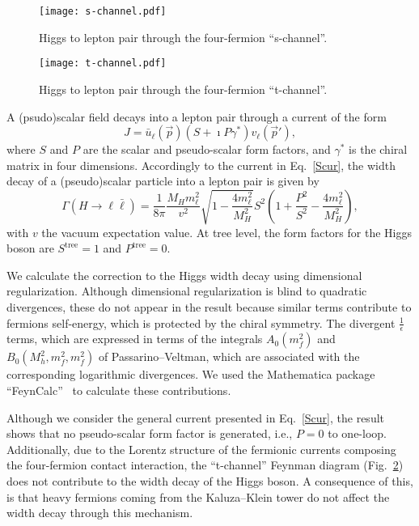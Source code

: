 \documentclass{ws-mpla}
\newcommand{\ga}{\gamma}
\renewcommand{\(}{\left(}
\renewcommand{\)}{\right)}
\renewcommand{\[}{\left[}
\renewcommand{\]}{\right]}
\begin{document}
\begin{figure}[htb]
  \begin{center}
    \texttt{[image: s-channel.pdf]}
  \end{center}
  \caption{Higgs to lepton pair through the four-fermion \mbox{``s-channel''.}}
  \label{fig:s}
\end{figure}
\begin{figure}[htb]
  \begin{center}
    \texttt{[image: t-channel.pdf]}
  \end{center}
  \caption{Higgs to lepton pair through the four-fermion \mbox{``t-channel''.}}
  \label{fig:t}
\end{figure}

A (psudo)scalar field decays into a lepton pair through a current of the form
\begin{equation}
  J = \bar{u}_\ell(\vec{p}) \( S + \imath P \ga^* \) v_\ell(\vec{p}'),
  \label{Scur}
\end{equation}
where $S$ and $P$ are the scalar and pseudo-scalar form factors, and $\ga^*$ is the chiral matrix in four dimensions. Accordingly to the current in Eq.~\eqref{Scur}, the width decay of a (pseudo)scalar particle into a lepton pair is given by 
\begin{equation}
  \Gamma(H \to \ell \bar{\ell}) = \frac{1}{8 \pi} \frac{M_H m_\ell^2}{v^2}  \sqrt{1 - \frac{4 m_\ell^2}{M_H^2} }  S^2 \( 1 + \frac{P^2}{S^2} - \frac{4 m_\ell^2}{M_H^2} \),
\end{equation}
with $v$ the vacuum expectation value. At tree level, the form factors for the Higgs boson are $S^{\text{tree}} = 1$ and $P^{\text{tree}} = 0$.

We calculate the correction to the Higgs width decay using dimensional regularization. Although dimensional regularization is blind to quadratic divergences, these do not appear in the result because similar terms contribute to fermions self-energy, which is protected by the chiral symmetry. The divergent $\frac{1}{\epsilon}$ terms, which are expressed in terms of the integrals $A_0(m_f^2)$ and $B_0(M_h^2,m_f^2,m_f^2)$ of Passarino--Veltman, which are associated with the corresponding logarithmic divergences. We used the Mathematica package ``FeynCalc''~\cite{Kublbeck:1992mt} to calculate these contributions.

Although we consider the general current presented in Eq.~\eqref{Scur}, the result shows that no pseudo-scalar form factor is generated, i.e., $P = 0$ to one-loop. Additionally, due to the Lorentz structure of the fermionic currents composing the four-fermion contact interaction, the ``t-channel'' Feynman diagram (Fig.~\ref{fig:t}) does not contribute to the width decay of the Higgs boson. A consequence of this, is that heavy fermions coming from the Kaluza--Klein tower do not affect the width decay through this mechanism.
\end{document}

